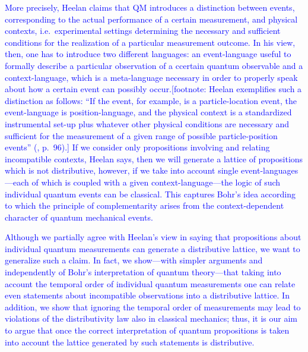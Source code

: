 \documentclass[11pt, executivepaper]{article}
\begin{document}
\begin{enumerate}
\textcolor{blue}{More precisely, Heelan claims that QM introduces a distinction between events, corresponding to the actual performance of a certain measurement, and physical contexts, i.e.\ experimental settings determining the necessary and sufficient conditions for the realization of a particular measurement outcome. In his view, then, one has to introduce two different languages: an event-language useful to formally describe a particular observation of a ccertain quantum observable and a context-language, which is a meta-language necessary in order to properly speak about how a certain event can possibly occur.[footnote: Heelan exemplifies such a distinction as follows: ``If the event, for example, is a particle-location event, the event-language is position-language, and the physical context is a standardized instrumental set-up plus whatever other physical conditions are necessary and sufficient for the measurement of a given range of possible particle-position events'' (\cite{Heelan:1970}, p.\ 96).] If we consider only propositions involving and relating incompatible contexts, Heelan says, then we will generate a lattice of propositions which is not distributive, however, if we take into account single event-languages---each of which is coupled with a given context-language---the logic of such individual quantum events can be classical. This captures Bohr's idea according to which the principle of complementarity arises from the context-dependent character of quantum mechanical events.}

\textcolor{blue}{Although we partially agree with Heelan's view in saying that propositions about individual quantum measurements can generate a distributive lattice, we want to generalize such a claim. In fact, we show---with simpler arguments and independently of Bohr's interpretation of quantum theory---that taking into account the temporal order of individual quantum measurements one can relate even statements about incompatible observations into a distributive lattice. In addition, we show that ignoring the temporal order of measurements may lead to violations of the distributivity law also in classical mechanics; thus, it is our aim to argue that once the correct interpretation of quantum propositions is taken into account the lattice generated by such statements is distributive.}


\end{enumerate}
\end{document}
